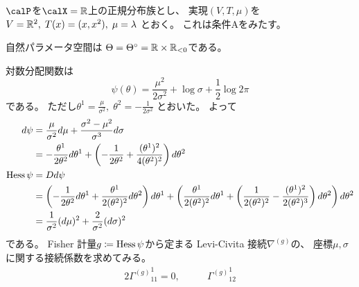 \documentclass[report]{jlreq}
\begin{document}
\begin{example}[正規分布族]
    $\calP$を$\calX = \R$上の正規分布族とし、
    実現$(V, T, \mu)$を
    $V = \mathbb{R}^2, \;
        T(x) = (x, x^2), \;
        \mu = \lambda$
    とおく。
    これは条件Aをみたす。

    自然パラメータ空間は
    $\Theta = \Theta^\circ = \mathbb{R} \times \mathbb{R}_{< 0}$である。

    対数分配関数は
    \begin{equation}
        \psi(\theta)
            = \frac{\mu^2}{2 \sigma^2}
            + \log \sigma
            + \frac{1}{2} \log 2\pi
    \end{equation}
    である。
    ただし$\theta^1 = \frac{\mu}{\sigma^2}, \;
        \theta^2 = -\frac{1}{2 \sigma^2}$
    とおいた。
    よって
    \begin{alignat}{1}
        d\psi
            &=
                \frac{\mu}{\sigma^2}
                d\mu
                + \frac{\sigma^2 - \mu^2}{\sigma^3}
                d\sigma
                \\
            &=
                -\frac{\theta^1}{2\theta^2} d\theta^1
                +\left({
                    -\frac{1}{2\theta^2}
                    + \frac{(\theta^1)^2}{4(\theta^2)^2}
                }\right)
                d\theta^2
                \\
        \operatorname{Hess}\psi
            &= Dd\psi \\
            &=
                \left({
                    -\frac{1}{2\theta^2}
                    d\theta^1
                    + \frac{\theta^1}{2(\theta^2)^2}
                    d\theta^2
                }\right)
                d\theta^1
                +
                \left({
                    \frac{\theta^1}{2(\theta^2)^2}
                    d\theta^1
                    + \left({
                        \frac{1}{2(\theta^2)^2}
                        - \frac{(\theta^1)^2}{2(\theta^2)^3}
                    }\right)
                    d\theta^2
                }\right)
                d\theta^2
                \\
            &=
                \frac{1}{\sigma^2} (d\mu)^2
                + \frac{2}{\sigma^2} (d\sigma)^2
    \end{alignat}
    である。
    Fisher 計量$g \coloneqq \operatorname{Hess}\psi$から定まる
    Levi-Civita 接続$\nabla^{(g)}$の、
    座標$\mu, \sigma$に関する接続係数を求めてみる。
    \begin{alignat}{2}
        {\Gamma^{(g)}}_{11}^1
            = 0,
            &\qquad
                {\Gamma^{(g)}}_{12}^1

\end{alignat}
\end{example}
\end{document}
